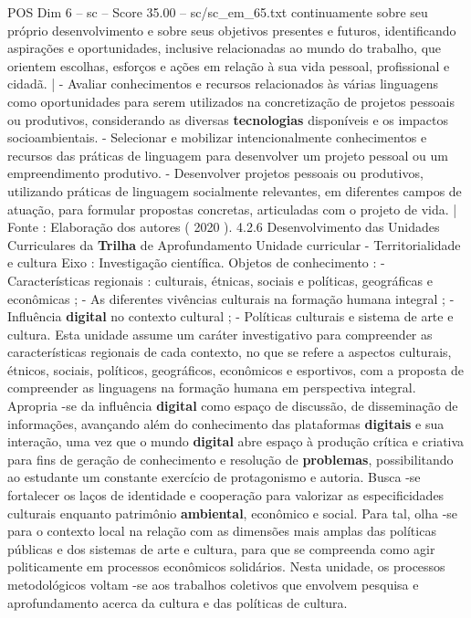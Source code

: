 \begin{textsample}{POS Dim 6 – sc – Score 35.00 – sc/sc\_em\_65.txt}
continuamente sobre seu próprio desenvolvimento e sobre seus objetivos presentes e futuros, identificando aspirações e oportunidades, inclusive relacionadas ao mundo do trabalho, que orientem escolhas, esforços e ações em relação à sua vida pessoal, profissional e cidadã. | - Avaliar conhecimentos e recursos relacionados às várias linguagens como oportunidades para serem utilizados na concretização de projetos pessoais ou produtivos, considerando as diversas \textbf{tecnologias} disponíveis e os impactos socioambientais. - Selecionar e mobilizar intencionalmente conhecimentos e recursos das práticas de linguagem para desenvolver um projeto pessoal ou um empreendimento produtivo. - Desenvolver projetos pessoais ou produtivos, utilizando práticas de linguagem socialmente relevantes, em diferentes campos de atuação, para formular propostas concretas, articuladas com o projeto de vida. | Fonte : Elaboração dos autores ( 2020 ). 4.2.6 Desenvolvimento das Unidades Curriculares da \textbf{Trilha} de Aprofundamento Unidade curricular - Territorialidade e cultura Eixo : Investigação científica.
Objetos de conhecimento : - Características regionais : culturais, étnicas, sociais e políticas, geográficas e econômicas ; - As diferentes vivências culturais na formação humana integral ; - Influência \textbf{digital} no contexto cultural ; - Políticas culturais e sistema de arte e cultura.
Esta unidade assume um caráter investigativo para compreender as características regionais de cada contexto, no que se refere a aspectos culturais, étnicos, sociais, políticos, geográficos, econômicos e esportivos, com a proposta de compreender as linguagens na formação humana em perspectiva integral.
Apropria -se da influência \textbf{digital} como espaço de discussão, de disseminação de informações, avançando além do conhecimento das plataformas \textbf{digitais} e sua interação, uma vez que o mundo \textbf{digital} abre espaço à produção crítica e criativa para fins de geração de conhecimento e resolução de \textbf{problemas}, possibilitando ao estudante um constante exercício de protagonismo e autoria.
Busca -se fortalecer os laços de identidade e cooperação para valorizar as especificidades culturais enquanto patrimônio \textbf{ambiental}, econômico e social.
Para tal, olha -se para o contexto local na relação com as dimensões mais amplas das políticas públicas e dos sistemas de arte e cultura, para que se compreenda como agir politicamente em processos econômicos solidários.
Nesta unidade, os processos metodológicos voltam -se aos trabalhos coletivos que envolvem pesquisa e aprofundamento acerca da cultura e das políticas de cultura.

\end{textsample}
